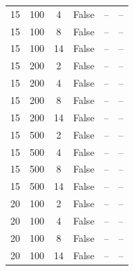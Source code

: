 \begin{table}[H]
\begin{minipage}{0.48\textwidth}
\begin{tabular}{cccccc}
		15            & 100                             & 4                        & False            & --            & --                \\
		15            & 100                             & 8                        & False            & --            & --                \\
		15            & 100                             & 14                       & False            & --            & --                \\
		15            & 200                             & 2                        & False            & --            & --                \\
		15            & 200                             & 4                        & False            & --            & --                \\
		15            & 200                             & 8                        & False            & --            & --                \\
		15            & 200                             & 14                       & False            & --            & --                \\
		15            & 500                             & 2                        & False            & --            & --                \\
		15            & 500                             & 4                        & False            & --            & --                \\
		15            & 500                             & 8                        & False            & --            & --                \\
		15            & 500                             & 14                       & False            & --            & --                \\
		\midrule
		20            & 100                             & 2                        & False            & --            & --                \\
		20            & 100                             & 4                        & False            & --            & --                \\
		20            & 100                             & 8                        & False            & --            & --                \\
		20            & 100                             & 14                       & False            & --            & --                \\

\end{tabular}
\end{minipage}
\end{table}
